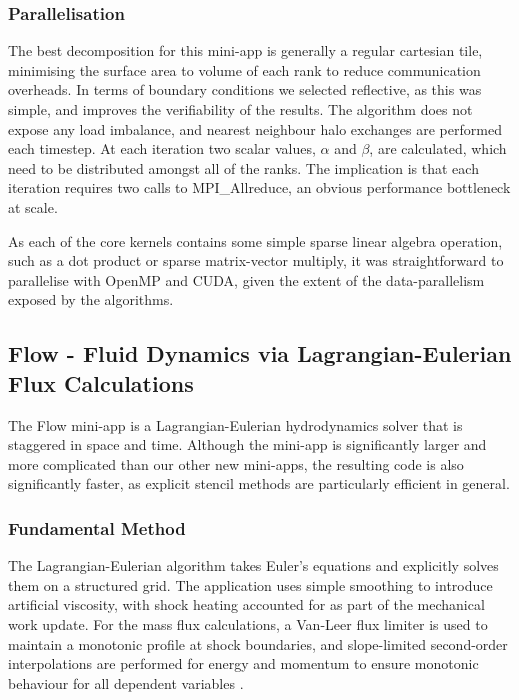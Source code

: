 \documentclass[runningheads,a4paper]{llncs}
\begin{document}
\subsubsection{Parallelisation}

The best decomposition for this mini-app is generally a regular cartesian tile, minimising the surface area to volume of each rank to reduce communication overheads. In terms of boundary conditions we selected reflective, as this was simple, and improves the verifiability of the results. The algorithm does not expose any load imbalance, and nearest neighbour halo exchanges are performed each timestep. At each iteration two scalar values, $\alpha$ and $\beta$, are calculated, which need to be distributed amongst all of the ranks. The implication is that each iteration requires two calls to MPI\_Allreduce, an obvious performance bottleneck at scale. 

As each of the core kernels contains some simple sparse linear algebra operation, such as a dot product or sparse matrix-vector multiply, it was straightforward to parallelise with OpenMP and CUDA, given the extent of the data-parallelism exposed by the algorithms.

\subsection{Flow - Fluid Dynamics via Lagrangian-Eulerian Flux Calculations}

\label{sec:flow}

The Flow mini-app is a Lagrangian-Eulerian hydrodynamics solver that is staggered in space and time. Although the mini-app is significantly larger and more complicated than our other new mini-apps, the resulting code is also significantly faster, as explicit stencil methods are particularly efficient in general.

\subsubsection{Fundamental Method}

The Lagrangian-Eulerian algorithm takes Euler's equations and explicitly solves them on a structured grid. The application uses simple smoothing to introduce artificial viscosity, with shock heating accounted for as part of the mechanical work update. For the mass flux calculations, a Van-Leer flux limiter is used to maintain a monotonic profile at shock boundaries, and slope-limited second-order interpolations are performed for energy and momentum to ensure monotonic behaviour for all dependent variables \cite{Berger2005}.
\end{document}
